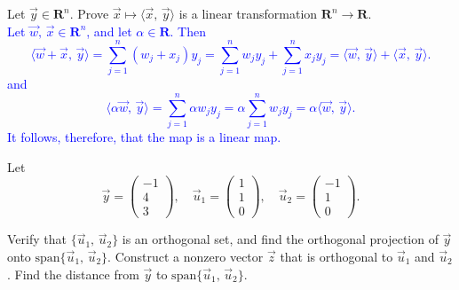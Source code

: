 \documentclass[a4paper,11pt]{article}
\newcommand{\R}{\mathbf{R}}
\newcommand{\blue}[1]{\textcolor{blue}{#1}}
\begin{document}
 Let $\vec y \in \R^n$. Prove $\vec x \mapsto
\langle \vec x,\,\vec y \rangle$ is a linear transformation $\R^n \rightarrow
\R$. \\

\blue{Let $\vec w,\,\vec x \in \R^n$, and let $\alpha \in \R$. Then
  \[
    \langle \vec w+\vec x,\,\vec y \rangle =
    \sum_{j=1}^n (w_j+x_j)y_j = \sum_{j=1}^nw_jy_j+\sum_{j=1}^nx_jy_j = \langle
    \vec w,\,\vec y \rangle + \langle \vec x,\,\vec y \rangle.
  \]
  and
  \[
    \langle \alpha\vec w,\,\vec y \rangle = \sum_{j=1}^n\alpha w_jy_j =
    \alpha\sum_{j=1}^nw_jy_j = \alpha\langle \vec w,\,\vec y \rangle.
  \]
  It follows, therefore, that the map is a linear map. \\}

 Let
\[
  \vec y =
  \left(
    \begin{array}{r}
      -1\\4\\3
    \end{array}
  \right), \quad
  \vec u_1 =
  \left(
    \begin{array}{r}
      1\\1\\0
    \end{array}
  \right), \quad
  \vec u_2 =
  \left(
    \begin{array}{r}
      -1\\1\\0
    \end{array}
  \right).
\]

\noindent Verify that $\{\vec u_1,\,\vec u_2\}$ is an orthogonal set, and find
the orthogonal projection of $\vec y$ onto $\text{span}\{\vec u_1,\,\vec u_2\}$.
Construct a nonzero vector $\vec z$ that is orthogonal to $\vec u_1$ and $\vec
u_2$. Find the distance from $\vec y$ to $\text{span}\{\vec u_1,\,\vec u_2\}$.
\\
\end{document}
